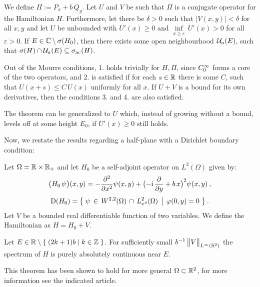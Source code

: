\begin{thm}
    We define $\mathit\Pi := P_x + b \, Q_y$. Let $U$ and $V$ be such that $\mathit\Pi$ is a conjugate operator for the Hamiltonian $H$. Furthermore, let there be $\delta>0$ such that $|V(x,y)|<\delta$ for all $x,y$ and let $U$ be unbounded with $U'(x) \geq 0$ and $\underset{x\geq\varepsilon}{\inf} \, U'(x) > 0$ for all $\varepsilon>0$. If $E \in \mathbb{C} \setminus \sigma(H_0)$, then there exists some open neighbourhood $\mathcal{U}_a(E)$, such that $\sigma(H) \cap \mathcal{U}_a(E) \subseteq \sigma_{\mathrm{ac}}(H)$.
\end{thm}

\begin{lemma}
    Out of the Mourre conditions, 1. holds trivially for $H, \mathit\Pi$, since $C_0^\infty$ forms a core of the two operators, and 2. is satisfied if for each $s\in\mathbb{R}$ there is some $C$, such that $U(x+s) \leq C \, U(x)$ uniformly for all $x$. If $U+V$ is a bound for its own derivatives, then the conditions 3. and 4. are also satisfied.
\end{lemma}

\begin{lemma}
    The theorem can be generalized to $U$ which, instead of growing without a bound, levels off at some height $E_0$, if $U'(x)\geq 0$ still holds.
\end{lemma}

Now, we restate the results regarding a half-plane with a Dirichlet boundary condition:

\begin{defn}
    \label{defn-hamiltonian-dirichlet}
    Let $\Omega=\mathbb{R}\times\mathbb{R}_+$ and let $H_0$ be a self-adjoint operator on $L^2(\Omega)$ given by:
    \begin{gather*}
        \big( H_0 \, \psi \big)(x, y)
        = -\frac{\partial ^2}{\partial x^2} \psi(x, y)
        + \big( {-\mathrm{i}} \, \frac{\partial }{\partial y} + b \, x \big)^2 \psi(x, y)
        \: ,
        \\[3pt]
        \mathrm{D}(H_0)
        = \big\{
            \;
            \psi \,\in\, W^{2,2}(\Omega)
            \,\cap\, L^2_{x^4}(\Omega)
            \;\, \big| \;\,
            \varphi(0, y) = 0
            \;
        \big\}
        \: .
    \end{gather*}
    Let $V$ be a bounded real differentiable function of two variables. We define the Hamiltonian as $H = H_0 + V$.
\end{defn}
\begin{thm}
    Let $E \in \mathbb{R} \setminus \{ \; (2k+1)b \;|\; k \in \mathbb{Z} \;\}$. For sufficiently small $b^{-1} \, \big\lVert V \big\rVert_{L^\infty(\mathbb{R}^2)}$ the spectrum of $H$ is purely absolutely continuous near $E$.
\end{thm}
\noindent This theorem has been shown to hold for more general $\Omega \subset \mathbb{R}^2$, for more information see the indicated article.

